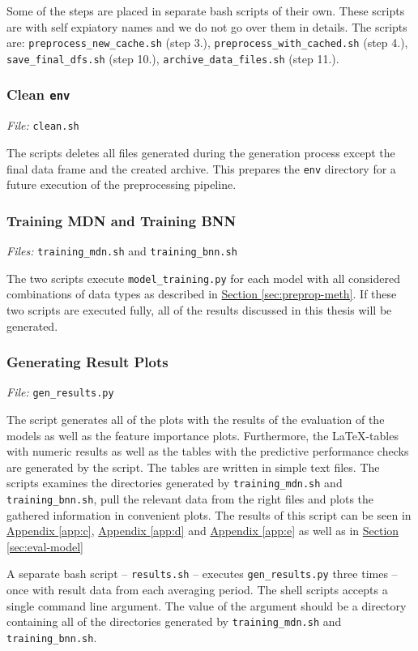 \documentclass[12pt,a4paper,twoside]{scrartcl}
\numberwithin{equation}{section}
\newcommand{\refsec}[1]{\hyperref[#1]{Section \ref*{#1}}}
\newcommand{\refapp}[1]{\hyperref[#1]{Appendix \ref*{#1}}}
\begin{document}
Some of the steps are placed in separate bash scripts of their own. These scripts are with self expiatory names and we do not go over them in details. The scripts are: \texttt{preprocess\_new\_cache.sh} (step 3.), \texttt{preprocess\_with\_cached.sh} (step 4.), \texttt{save\_final\_dfs.sh} (step 10.), \texttt{archive\_data\_files.sh} (step 11.).
\subsubsection{Clean \texttt{env}}\label{sec:script-clean}
\noindent\emph{File: }\texttt{clean.sh}

The scripts deletes all files generated during the generation process except the final data frame and the created archive. This prepares the \texttt{env} directory for a future execution of the preprocessing pipeline.
\subsubsection{Training MDN and Training BNN}\label{sec:script-train}
\noindent\emph{Files: }\texttt{training\_mdn.sh} and \texttt{training\_bnn.sh}

The two scripts execute \texttt{model\_training.py} for each model with all considered combinations of data types as described in \refsec{sec:preprop-meth}. If these two scripts are executed fully, all of the results discussed in this thesis will be generated.
\subsubsection{Generating Result Plots}\label{sec:script-gen-res}
\noindent\emph{File: }\texttt{gen\_results.py}

The script generates all of the plots with the results of the evaluation of the models as well as the feature importance plots. Furthermore, the \LaTeX{}-tables with numeric results as well as the tables with the predictive performance checks are generated by the script. The tables are written in simple text files. The scripts examines the directories generated by \texttt{training\_mdn.sh} and \texttt{training\_bnn.sh}, pull the relevant data from the right files and plots the gathered information in convenient plots. The results of this script can be seen in \refapp{app:c}, \refapp{app:d} and \refapp{app:e} as well as in \refsec{sec:eval-model}

A separate bash script -- \texttt{results.sh} -- executes \texttt{gen\_results.py} three times -- once with result data from each averaging period. The shell scripts accepts a single command line argument. The value of the argument should be a directory containing all of the directories generated by \texttt{training\_mdn.sh} and \texttt{training\_bnn.sh}.
\end{document}
